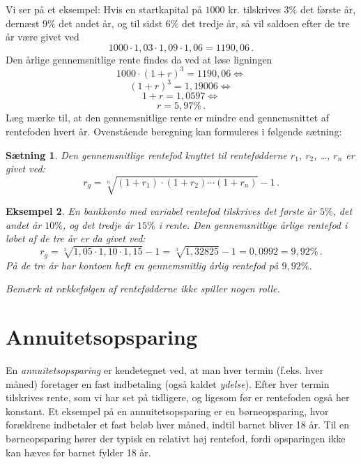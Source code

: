 \documentclass[12pt,oneside,a4paper]{article}
\newtheorem{thm}{Sætning}[section]
\newtheorem{eks}[thm]{Eksempel}
\begin{document}
Vi ser på et eksempel: Hvis en startkapital på $1000$ kr. tilskrives $3\%$ det
første år, dernæst $9\%$ det andet år, og til sidst $6\%$ det tredje år, så vil
saldoen efter de tre år være givet ved
\[
    1000\cdot 1,03 \cdot 1,09 \cdot 1,06 = 1190,06\,.
\]
Den årlige gennemsnitlige rente findes da ved at løse ligningen
\[
    1000\cdot (1+r)^3 = 1190,06 \Leftrightarrow 
\]
\[
    (1+r)^3=1,19006 \Leftrightarrow
\]
\[
    1+r = 1,0597 \Leftrightarrow
\]
\[
    r = 5,97\%\,.
\]
Læg mærke til, at den gennemsnitlige rente er mindre end gennemsnittet af
rentefoden hvert år.  Ovenstående beregning kan formuleres i følgende sætning:
\begin{tcolorbox}
\begin{thm}
    Den gennemsnitlige rentefod knyttet til rentefødderne $r_1$, $r_2$, \ldots, $r_n$
    er givet ved:
    \[
        r_g = \sqrt[n]{(1+r_1)\cdot(1+r_2)\cdots(1+r_n)}-1 \,.
    \]
\end{thm}
\end{tcolorbox}
\begin{tcolorbox}
\begin{eks}
    En bankkonto med variabel rentefod tilskrives det første år $5\%$, det andet
    år $10\%$, og det tredje år $15\%$ i rente. Den gennemsnitlige årlige rentefod
    i løbet af de tre år er da givet ved:
    \[
        r_g = \sqrt[3]{1,05\cdot1,10\cdot1,15}-1 = \sqrt[3]{1,32825}-1 = 0,0992 = 9,92\%\,.
    \]
På de tre år har kontoen heft en gennemsnitlig årlig rentefod på $9,92\%$.

    Bemærk at rækkefølgen af rentefødderne ikke spiller nogen rolle.
\end{eks}
\end{tcolorbox}


\section{Annuitetsopsparing}
En \emph{annuitetsopsparing} er kendetegnet ved, at man hver termin (f.eks. hver
måned) foretager en fast indbetaling (også kaldet \emph{ydelse}). Efter hver
termin tilskrives rente, som vi har set på tidligere, og ligesom før er
rentefoden også her konstant. Et eksempel på en annuitetsopsparing er en
børneopsparing, hvor forældrene indbetaler et fast beløb hver måned, indtil
barnet bliver 18 år. Til en børneopsparing hører der typisk en relativt høj
rentefod, fordi opsparingen ikke kan hæves før barnet fylder 18 år.
\end{document}
